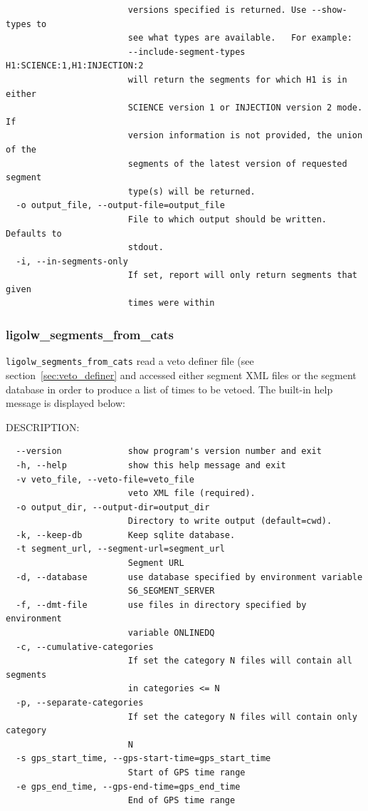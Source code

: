 {\begin{verbatim}
                        versions specified is returned. Use --show-types to
                        see what types are available.   For example:
                        --include-segment-types H1:SCIENCE:1,H1:INJECTION:2
                        will return the segments for which H1 is in either
                        SCIENCE version 1 or INJECTION version 2 mode. If
                        version information is not provided, the union of the
                        segments of the latest version of requested segment
                        type(s) will be returned.
  -o output_file, --output-file=output_file
                        File to which output should be written.  Defaults to
                        stdout.
  -i, --in-segments-only
                        If set, report will only return segments that given
                        times were within
\end{verbatim}
}



\subsubsection{ligolw\_segments\_from\_cats}
\label{ssec:from_cats}

\texttt{ligolw\_segments\_from\_cats} read a veto definer file (see
section~\ref{sec:veto_definer} and accessed either segment XML files
or the segment database in order to produce a list of times to be
vetoed.  The built-in help message is displayed below:

DESCRIPTION:
\begin{verbatim}
  --version             show program's version number and exit
  -h, --help            show this help message and exit
  -v veto_file, --veto-file=veto_file
                        veto XML file (required).
  -o output_dir, --output-dir=output_dir
                        Directory to write output (default=cwd).
  -k, --keep-db         Keep sqlite database.
  -t segment_url, --segment-url=segment_url
                        Segment URL
  -d, --database        use database specified by environment variable
                        S6_SEGMENT_SERVER
  -f, --dmt-file        use files in directory specified by environment
                        variable ONLINEDQ
  -c, --cumulative-categories
                        If set the category N files will contain all segments
                        in categories <= N
  -p, --separate-categories
                        If set the category N files will contain only category
                        N
  -s gps_start_time, --gps-start-time=gps_start_time
                        Start of GPS time range
  -e gps_end_time, --gps-end-time=gps_end_time
                        End of GPS time range
\end{verbatim}


